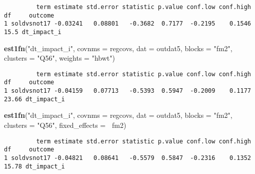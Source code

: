 \documentclass[11pt,]{article}
\newenvironment{Shaded}{\begin{snugshade}}{\end{snugshade}}
\newcommand{\CommentTok}[1]{\textcolor[rgb]{0.56,0.35,0.01}{\textit{#1}}}
\newcommand{\DataTypeTok}[1]{\textcolor[rgb]{0.13,0.29,0.53}{#1}}
\newcommand{\KeywordTok}[1]{\textcolor[rgb]{0.13,0.29,0.53}{\textbf{#1}}}
\newcommand{\NormalTok}[1]{#1}
\newcommand{\OperatorTok}[1]{\textcolor[rgb]{0.81,0.36,0.00}{\textbf{#1}}}
\newcommand{\StringTok}[1]{\textcolor[rgb]{0.31,0.60,0.02}{#1}}
\begin{document}
\begin{verbatim}
         term estimate std.error statistic p.value conf.low conf.high   df     outcome
1 soldvsnot17 -0.03241   0.08801   -0.3682  0.7177  -0.2195    0.1546 15.5 dt_impact_i
\end{verbatim}

\begin{Shaded}
\begin{Highlighting}[]
\KeywordTok{est1fn}\NormalTok{(}\StringTok{"dt_impact_i"}\NormalTok{, }\DataTypeTok{covnms =}\NormalTok{ regcovs, }\DataTypeTok{dat =}\NormalTok{ outdat5, }\DataTypeTok{blocks =} \StringTok{"fm2"}\NormalTok{, }\DataTypeTok{clusters =} \StringTok{"Q56"}\NormalTok{, }\DataTypeTok{weights =} \StringTok{"hbwt"}\NormalTok{)}
\end{Highlighting}
\end{Shaded}

\begin{verbatim}
         term estimate std.error statistic p.value conf.low conf.high    df     outcome
1 soldvsnot17 -0.04159   0.07713   -0.5393  0.5947  -0.2009    0.1177 23.66 dt_impact_i
\end{verbatim}

\begin{Shaded}
\begin{Highlighting}[]
\KeywordTok{est1fn}\NormalTok{(}\StringTok{"dt_impact_i"}\NormalTok{, }\DataTypeTok{covnms =}\NormalTok{ regcovs, }\DataTypeTok{dat =}\NormalTok{ outdat5, }\DataTypeTok{blocks =} \StringTok{"fm2"}\NormalTok{, }\DataTypeTok{clusters =} \StringTok{"Q56"}\NormalTok{, }\DataTypeTok{fixed_effects =} \OperatorTok{~}\NormalTok{fm2)}
\end{Highlighting}
\end{Shaded}

\begin{verbatim}
         term estimate std.error statistic p.value conf.low conf.high    df     outcome
1 soldvsnot17 -0.04821   0.08641   -0.5579  0.5847  -0.2316    0.1352 15.78 dt_impact_i
\end{verbatim}

\begin{Shaded}
\end{Shaded}
\end{document}
